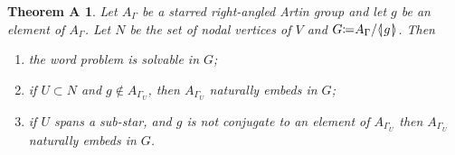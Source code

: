 \documentclass[12pt, a4paper]{amsart}
\newtheorem*{ThmA}{Theorem A}
\theoremstyle{remark}
\theoremstyle{definition}
\begin{document}
\begin{ThmA} Let $A_\Gamma$ be a starred right-angled Artin group and let $g$ be an element of $A_\Gamma$. Let $N$ be the set of nodal vertices of $V$ and $G{\mathrel{\mathop\mathchar"303A}\mkern-1.2mu=} A_\Gamma/{{{\langle}{\mkern-3.7mu}{\lvert}{\mkern1.2mu}{{g}}{\mkern1.2mu}{\rvert}{\mkern-3.7mu}{\rangle}}}$. Then
\begin{enumerate}
\item[(i)] the word problem is solvable in $G$;
\item[(ii)] if $U\subset N$ and $g\not\in A_{{\Gamma}_U}$, then $A_{{\Gamma}_U}$ naturally embeds in $G$;
\item[(iii)] if $U$ spans a sub-star, and $g$ is not conjugate to an element of $A_{{\Gamma}_U}$ then $A_{{\Gamma}_U}$ naturally embeds in $G$.
\end{enumerate}
\end{ThmA} 
\end{document}
